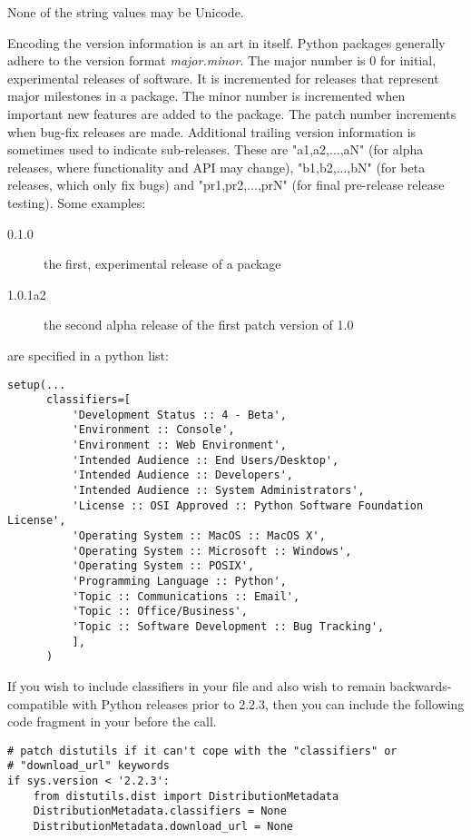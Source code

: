 \documentclass{manual}
\begin{document}
None of the string values may be Unicode.

Encoding the version information is an art in itself. Python packages
generally adhere to the version format
\emph{major.minor}. The major number is
0 for
initial, experimental releases of software. It is incremented for
releases that represent major milestones in a package. The minor
number is incremented when important new features are added to the
package. The patch number increments when bug-fix releases are
made. Additional trailing version information is sometimes used to
indicate sub-releases.  These are "a1,a2,...,aN" (for alpha releases,
where functionality and API may change), "b1,b2,...,bN" (for beta
releases, which only fix bugs) and "pr1,pr2,...,prN" (for final
pre-release release testing). Some examples:

\begin{description}
\item[0.1.0] the first, experimental release of a package
\item[1.0.1a2] the second alpha release of the first patch version of 1.0
\end{description}

 are specified in a python list:

\begin{verbatim}
setup(...
      classifiers=[
          'Development Status :: 4 - Beta',
          'Environment :: Console',
          'Environment :: Web Environment',
          'Intended Audience :: End Users/Desktop',
          'Intended Audience :: Developers',
          'Intended Audience :: System Administrators',
          'License :: OSI Approved :: Python Software Foundation License',
          'Operating System :: MacOS :: MacOS X',
          'Operating System :: Microsoft :: Windows',
          'Operating System :: POSIX',
          'Programming Language :: Python',
          'Topic :: Communications :: Email',
          'Topic :: Office/Business',
          'Topic :: Software Development :: Bug Tracking',
          ],
      )
\end{verbatim}

If you wish to include classifiers in your  file and also
wish to remain backwards-compatible with Python releases prior to 2.2.3,
then you can include the following code fragment in your 
before the  call.

\begin{verbatim}
# patch distutils if it can't cope with the "classifiers" or
# "download_url" keywords
if sys.version < '2.2.3':
    from distutils.dist import DistributionMetadata
    DistributionMetadata.classifiers = None
    DistributionMetadata.download_url = None
\end{verbatim}
\end{document}
